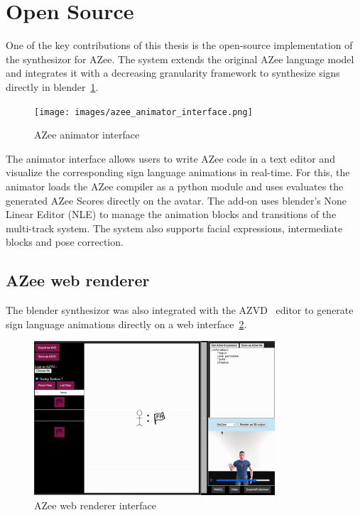 \documentclass[../../main.tex]{subfiles}
\begin{document}
\section{Open Source}
\label{ch:conclusion:opensource}

One of the key contributions of this thesis is the open-source implementation of the synthesizor for AZee. The system extends the original AZee language model and integrates it with a decreasing granularity framework to synthesize signs directly in blender~\ref{fig:azee_animator_interface}.

\begin{figure}[ht]
    \centering
    \texttt{[image: images/azee\_animator\_interface.png]}
    \caption{AZee animator interface}
    \label{fig:azee_animator_interface}
\end{figure}

The animator interface allows users to write AZee code in a text editor and visualize the corresponding sign language animations in real-time. For this, the animator loads the AZee compiler as a python module and uses evaluates the generated AZee Scores directly on the avatar. The add-on uses blender's None Linear Editor (NLE) to manage the animation blocks and transitions of the multi-track system. The system also supports facial expressions, intermediate blocks and pose correction.

\subsection{AZee web renderer}

The blender synthesizor was also integrated with the AZVD~\cite{azvd} editor to generate sign language animations directly on a web interface~\ref{fig:azee_web_interface}.

\begin{figure}[ht]
    \centering
    \includegraphics[width=0.8\textwidth]{images/azee_web_interface.png}
    \caption{AZee web renderer interface}
    \label{fig:azee_web_interface}
\end{figure}
\end{document}
